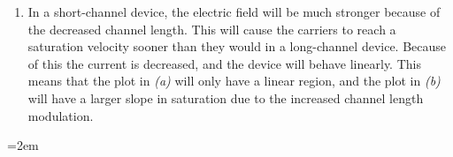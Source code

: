 \documentclass[12pt, fleqn]{article}
\begin{document}
\begin{enumerate}[label=(\alph*)]
    \item
        {
        In a short-channel device, the electric field will be much stronger because of the decreased channel length.  This will cause the carriers to reach a saturation velocity sooner than they would in a long-channel device.  Because of this the current is decreased, and the device will behave linearly.  This means that the plot in \textit{(a)} will only have a linear region, and the plot in \textit{(b)} will have a larger slope in saturation due to the increased channel length modulation.
        }
\end{enumerate}
\newpage
{}
\emergencystretch=2em
\nocite{*}
\printbibliography
\end{document}

